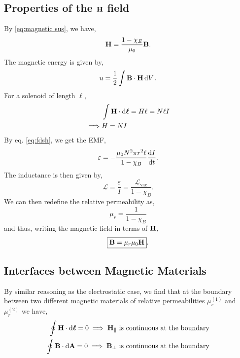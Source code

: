 \documentclass{book}
\begin{document}
\subsection{Properties of the $\vb{H}$ field}
By \eqref{eq:magnetic sus}, we have,
\begin{equation}
	\vb{H}= \frac{1 - \chi_E}{\mu_0}\vb{B}. \label{eq:fdsh}
\end{equation}
The magnetic energy is given by,
\begin{equation}
	u = \frac{1}{2}\int\vb{B}\cdot\vb{H} \dd{V}.
\end{equation}
For a solenoid of length $\ell$,
\begin{equation}
	\begin{split}
		&\int\vb{H} \cdot\dd{\vb*{\ell}} = H\ell = N\ell I \\
		\implies & H = NI
	\end{split}
\end{equation}
By eq. \eqref{eq:fdsh}, we get the EMF,
\begin{equation}
	\varepsilon = - \frac{\mu_0 N^2\pi r^2 \ell}{1 - \chi_B}\dv{I}{t}.
\end{equation}
The inductance is then given by,
\begin{equation}
	\mathcal{L} = \frac{\varepsilon}{I} = \frac{\mathcal{L}_{\text{vac}}}{1 - \chi_B}.
\end{equation}
We can then redefine the relative permeability as,
\begin{equation}
	\mu_r = \frac{1}{1 - \chi_B}
\end{equation}
and thus, writing the magnetic field in terms of $\vb{H}$,
\begin{equation}
	\boxed{\vb{B} = \mu_r\mu_0 \vb{H}}. \label{eq:H}
\end{equation}
\subsection{Interfaces between Magnetic Materials}
By similar reasoning as the electrostatic case, we find that at the boundary between two different magnetic materials of relative permeabilities $\mu_r^{(1)}$ and $\mu_r^{(2)}$ we have,
\begin{align}
	\oint \vb{H}\cdot\dd{\vb*{\ell}} = 0 \implies \vb{H}_{\parallel} \text{ is continuous at the boundary} \\
	\oint \vb{B}\cdot\dd{\vb{A}} = 0 \implies \vb{B}_{\perp} \text{ is continuous at the boundary}
\end{align}
\end{document}
